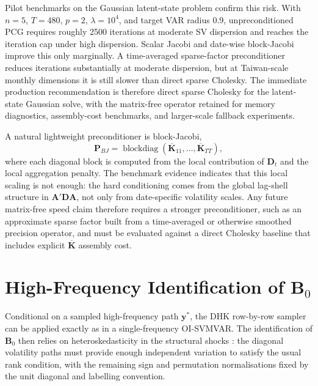 \documentclass[12pt]{article}
\begin{document}
Pilot benchmarks on the Gaussian latent-state problem confirm this risk. With $n=5$, $T=480$, $p=2$, $\lambda=10^4$, and target VAR radius 0.9, unpreconditioned PCG requires roughly 2500 iterations at moderate SV dispersion and reaches the iteration cap under high dispersion. Scalar Jacobi and date-wise block-Jacobi improve this only marginally. A time-averaged sparse-factor preconditioner reduces iterations substantially at moderate dispersion, but at Taiwan-scale monthly dimensions it is still slower than direct sparse Cholesky. The immediate production recommendation is therefore direct sparse Cholesky for the latent-state Gaussian solve, with the matrix-free operator retained for memory diagnostics, assembly-cost benchmarks, and larger-scale fallback experiments.

A natural lightweight preconditioner is block-Jacobi,
\begin{equation}
    \mathbf{P}_{BJ}=\operatorname{blockdiag}(\overline{\mathbf{K}}_{11},\ldots,\overline{\mathbf{K}}_{TT}),
\end{equation}
where each diagonal block is computed from the local contribution of $\mathbf{D}_t$ and the local aggregation penalty. The benchmark evidence indicates that this local scaling is not enough: the hard conditioning comes from the global lag-shell structure in $\mathbf{A}'\mathbf{D}\mathbf{A}$, not only from date-specific volatility scales. Any future matrix-free speed claim therefore requires a stronger preconditioner, such as an approximate sparse factor built from a time-averaged or otherwise smoothed precision operator, and must be evaluated against a direct Cholesky baseline that includes explicit $\overline{\mathbf{K}}$ assembly cost.

\section{High-Frequency Identification of \texorpdfstring{$\mathbf{B}_0$}{B0}}
Conditional on a sampled high-frequency path $\mathbf{y}^*$, the DHK row-by-row sampler can be applied exactly as in a single-frequency OI-SVMVAR. The identification of $\mathbf{B}_0$ then relies on heteroskedasticity in the structural shocks \citep{lutkepohl2020bayesian,davidson2025investigating}: the diagonal volatility paths must provide enough independent variation to satisfy the usual rank condition, with the remaining sign and permutation normalisations fixed by the unit diagonal and labelling convention.
\end{document}
